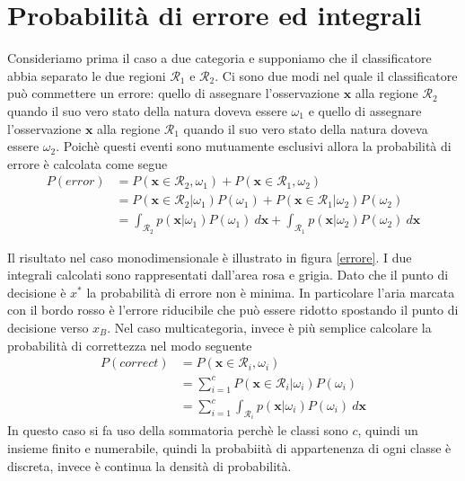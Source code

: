 \section{Probabilità di errore ed integrali}
Consideriamo prima il caso a due categoria e supponiamo che il classificatore abbia separato le due regioni $\mathcal{R}_1$ e $\mathcal{R}_2$. Ci sono due modi nel quale il classificatore può commettere un errore: quello di assegnare l'osservazione $\mathbf{x}$ alla regione $\mathcal{R}_2$ quando il suo vero stato della natura doveva essere $\omega_1$ e quello di assegnare l'osservazione $\mathbf{x}$ alla regione $\mathcal{R}_1$ quando il suo vero stato della natura doveva essere $\omega_2$. Poichè questi eventi sono mutuamente esclusivi allora la probabilità di errore è calcolata come segue
\begin{equation}
\begin{split}
P(error) &= P(\mathbf{x} \in \mathcal{R}_2, \omega_1) + P(\mathbf{x} \in \mathcal{R}_1, \omega_2) \\
&= P(\mathbf{x} \in \mathcal{R}_2|\omega_1) P(\omega_1) + P(\mathbf{x} \in \mathcal{R}_1|\omega_2) P(\omega_2)\\
&= \int_{\mathcal{R}_2} p(\mathbf{x}|\omega_1) P(\omega_1) \ d\mathbf{x} + \int_{\mathcal{R}_1} p(\mathbf{x}|\omega_2) P(\omega_2) \ d\mathbf{x}
\end{split}
\end{equation}

\noindent Il risultato nel caso monodimensionale è illustrato in figura \ref{errore}. I due integrali calcolati sono rappresentati dall'area rosa e grigia. Dato che il punto di decisione è $x^*$ la probabilità di errore non è minima. In particolare l'aria marcata con il bordo rosso è l'errore riducibile che può essere ridotto spostando il punto di decisione verso $x_B$. Nel caso multicategoria, invece è più semplice calcolare la probabilità di correttezza nel modo seguente
\begin{equation}
\begin{split}
P(correct) &= P(\mathbf{x} \in \mathcal{R}_i, \omega_i) \\
&= \sum_{i=1}^c P(\mathbf{x} \in \mathcal{R}_i | \omega_i) P(\omega_i) \\
&= \sum_{i=1}^c \int_{\mathcal{R}_i} p(\mathbf{x}|\omega_i)P(\omega_i) \ d\mathbf{x}
\end{split}
\end{equation} 
In questo caso si fa uso della sommatoria perchè le classi sono $c$, quindi un insieme finito e numerabile, quindi la probabiità di appartenenza di ogni classe è discreta, invece è continua la densità di probabilità. 


